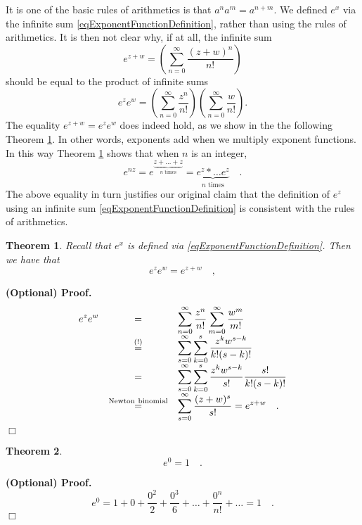 \documentclass[12pt]{book}
\newcommand{\eqAttention}{\stackrel{(!)}{=}}
\newcommand{\importantFormula}[1]{\begin{equation} \boxed{#1} \end{equation}}
\newenvironment{proofOptional}[1][]{ \noindent \textbf{(Optional) Proof#1.}}{$\Box$\medskip}
\newtheorem{theorem}{Theorem}[section]
\begin{document}
It is one of the basic rules of arithmetics is that $a^n a^{m}= a^{n+m} $. We defined $e^x$ via the infinite sum \eqref{eqExponentFunctionDefinition}, rather than using the rules of arithmetics. It is then not clear why, if at all, the infinite sum 
\[
e^{z+w} =\left(\sum\limits_{n=0}^{\infty} \frac{(z+w)^n}{n!}\right)
\]
should be equal to the product of infinite sums
\[
e^{z} e^w=\left(\sum\limits_{n=0}^{\infty} \frac{z^n}{n!}\right)\left(\sum\limits_{n=0}^{\infty} \frac{w}{n!} \right) .
\]
The equality $e^{z+w}= e^{z}e^{w}$ does indeed hold, as we show in the the following Theorem \ref{thExponentArgumentsAddWhenMultiplying}. In other words, exponents add when we multiply exponent functions. In this way Theorem \ref{thExponentArgumentsAddWhenMultiplying} shows that when $n$ is an integer, 
\begin{equation}\label{eqExponentToIntegerPowerRespectsArithmetics}
e^{n z}= e^{\underbrace{z+\dots +z}_{n\text{ times}} }=\underbrace{ e^{z}*\dots e^{z}}_{n \text{ times}}  \quad .
\end{equation}
The above equality in turn justifies our original claim that the definition of  $e^{z}$ using an infinite sum \eqref{eqExponentFunctionDefinition} is consistent with the rules of arithmetics.
\begin{theorem}\label{thExponentArgumentsAddWhenMultiplying}
Recall that $e^x$ is defined via \eqref{eqExponentFunctionDefinition}. Then we have that \importantFormula{
e^{z} e^{w}=e^{z+w}\quad ,
}
\end{theorem}
\begin{proofOptional}
\begin{equation*}
\begin{array}{rcl}
\displaystyle
\displaystyle e^{z} e^w&=&\displaystyle  \sum_{n=0}^{\infty} \frac{z^n}{n!} \sum_{m=0}^{\infty} \frac{w^m}{m!} \\ &\eqAttention&  \displaystyle  \sum_{s=0}^{\infty}\sum_{k=0 }^s \frac{z^{k}w^{s-k}}{k! (s-k)!} \\ &=& \displaystyle  \sum_{s=0}^{\infty}\sum_{k=0 }^s   \frac{z^{k}w^{s-k}}{s!} \frac{s!}{k! (s-k)!}\\ &\stackrel{\mathrm{Newton~binomial}}{=}& \displaystyle  \sum_{s=0}^{\infty} \frac{(z+w)^s}{s!}=e^{z+w}\quad .
\end{array}
\end{equation*}
\end{proofOptional}
\begin{theorem}
\[
e^0=1\quad .
\]
\end{theorem}
\begin{proofOptional}
\[ e^0 = 1+ 0+ \frac{0^2}{2}+ \frac{0^3}{6}+\dots +\frac{0^n}{n!}+\dots = 1\quad .
\]
\end{proofOptional}
\end{document}
